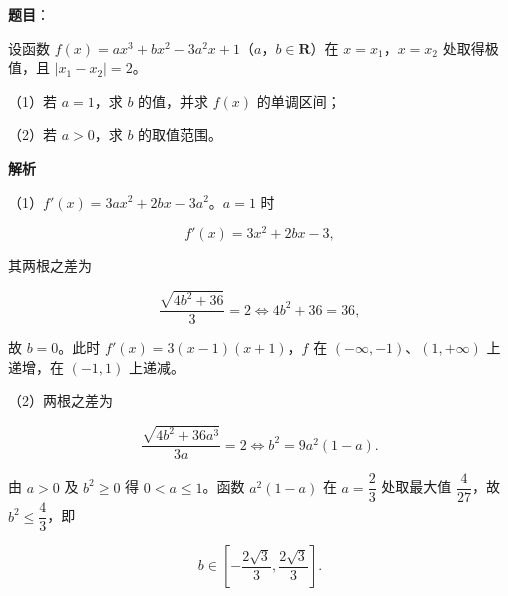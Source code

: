 \begin{answer}

\textbf{题目}：

设函数 $f(x)=ax^3+bx^2-3a^2x+1$（$a$，$b\in\mathbf R$）在 $x=x_1$，$x=x_2$ 处取得极值，且 $|x_1-x_2|=2$。

（1）若 $a=1$，求 $b$ 的值，并求 $f(x)$ 的单调区间；

（2）若 $a>0$，求 $b$ 的取值范围。

\textbf{解析}

（1）$f'(x)=3ax^2+2bx-3a^2$。$a=1$ 时

\nopagebreak[4]
\[f'(x)=3x^2+2bx-3,\]

其两根之差为

\nopagebreak[4]
\[\frac{\sqrt{4b^2+36}}{3}=2\iff 4b^2+36=36,\]

故 $b=0$。此时 $f'(x)=3(x-1)(x+1)$，$f$ 在 $(-\infty,-1)$、$(1,+\infty)$ 上递增，在 $(-1,1)$ 上递减。

（2）两根之差为

\nopagebreak[4]
\[\frac{\sqrt{4b^2+36a^3}}{3a}=2\iff b^2=9a^2(1-a).\]

由 $a>0$ 及 $b^2\geqslant0$ 得 $0<a\leqslant1$。函数 $a^2(1-a)$ 在 $a=\dfrac23$ 处取最大值 $\dfrac4{27}$，故 $b^2\leqslant\dfrac43$，即

\nopagebreak[4]
\[b\in\left[-\frac{2\sqrt3}{3},\frac{2\sqrt3}{3}\right].\]


\end{answer}